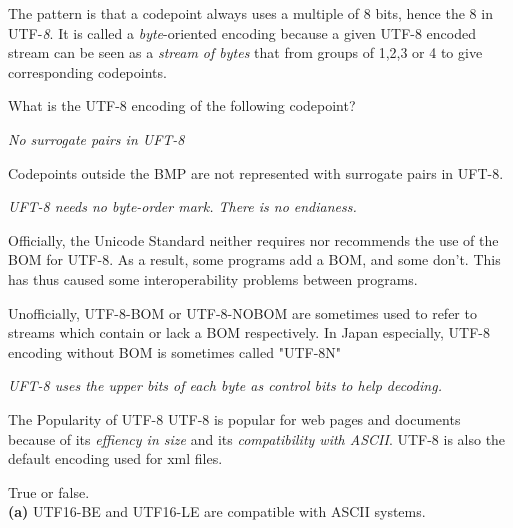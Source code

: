 
The pattern is that a codepoint always uses a multiple of 8 bits, hence the 8 in UTF-\textit{8}. 
It is called a \textit{byte}-oriented encoding because a given UTF-8 encoded 
stream can be seen as a \textit{stream of bytes} that from groups of 1,2,3 or 4 to give 
corresponding codepoints.  

\frmrule 


\begin{example}
What is the UTF-8 encoding of the following codepoint?
\end{example}

\frmrule 

\textit{No surrogate pairs in UFT-8}

Codepoints outside the BMP are not represented with surrogate pairs in UFT-8.


\frmrule 

\textit{UFT-8 needs no byte-order mark. There is no endianess.}

Officially, the Unicode Standard neither requires nor recommends 
the use of the BOM for UTF-8. As a result, some programs add a BOM, 
and some don't. This has thus caused some interoperability problems between 
programs.  


Unofficially, UTF-8-BOM or UTF-8-NOBOM are sometimes used to 
refer to streams which contain or lack a BOM respectively. 
In Japan especially, UTF-8 encoding without BOM is sometimes called "UTF-8N"



\frmrule 

\textit{UFT-8 uses the upper bits of each byte as control bits to help decoding.}

\frmrule 

\begin{sidenote}{The Popularity of UTF-8}
UTF-8 is popular for web pages and documents because of its \textit{effiency in size} 
and its \textit{compatibility with ASCII}.
UTF-8 is also the default encoding used for xml files. 
\end{sidenote}


\frmrule

\begin{example}
True or false. \\
\textbf{(a)} UTF16-BE and UTF16-LE are compatible with ASCII systems. %
\end{example}


